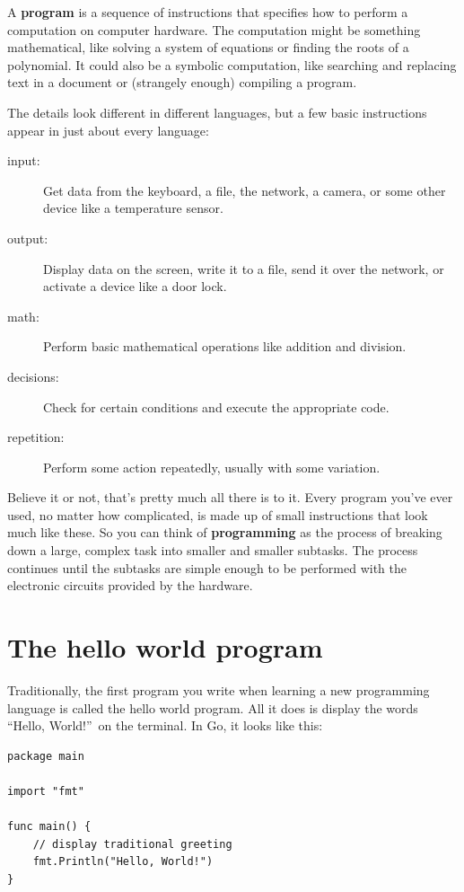 
A {\bf program} is a sequence of instructions that specifies how to perform a computation on computer hardware.
The computation might be something mathematical, like solving a system of equations or finding the roots of a polynomial.
It could also be a symbolic computation, like searching and replacing text in a document or (strangely enough) compiling a program.

The details look different in different languages, but a few basic instructions appear in just about every language:

\begin{description}
\item[input:] Get data from the keyboard, a file, the network, a camera, or some other device like a temperature sensor.
\item[output:] Display data on the screen, write it to a file, send it over the network, or activate a device like a door lock.
\item[math:] Perform basic mathematical operations like addition and division.
\item[decisions:] Check for certain conditions and execute the appropriate code.
\item[repetition:] Perform some action repeatedly, usually with some variation.
\end{description}


Believe it or not, that's pretty much all there is to it.
Every program you've ever used, no matter how complicated, is made up of small instructions that look much like these.
So you can think of {\bf programming} as the process of breaking down a large, complex task into smaller and smaller subtasks.
The process continues until the subtasks are simple enough to be performed with the electronic circuits provided by the hardware.

\section{The hello world program}
\label{hello}

Traditionally, the first program you write when learning a new programming language is called the hello world program.
All it does is display the words ``Hello, World!''\ on the terminal.
In Go, it looks like this:


\begin{lstlisting}
package main

import "fmt"

func main() {
	// display traditional greeting
	fmt.Println("Hello, World!") 
}
\end{lstlisting}

